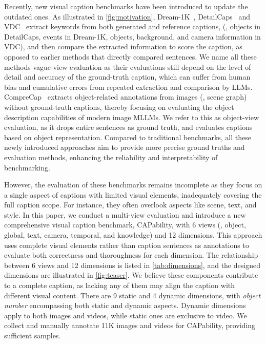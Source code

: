 Recently, new visual caption benchmarks have been introduced to update the outdated ones. As illustrated in \cref{fig:motivation}, Dream-1K~\cite{dream1k}, DetailCaps~\cite{detailcaps} and VDC~\cite{auroracap} extract keywords from both generated and reference captions, (\eg, objects in DetailCaps, events in Dream-1K, objects, background, and camera information in VDC), and then compare the extracted information to score the caption, as opposed to earlier methods that directly compared sentences. We name all these methods vague-view evaluation as their evaluations still depend on the level of detail and accuracy of the ground-truth caption, which can suffer from human bias and cumulative errors from repeated extraction and comparison by LLMs. 
CompreCap~\cite{comprecap} extracts object-related annotations from images (\eg, scene graph) without ground-truth captions, thereby focusing on evaluating the object description capabilities of modern image MLLMs. We refer to this as object-view evaluation, as it drops entire sentences as ground truth, and evaluates captions based on object representation. Compared to traditional benchmarks, all these newly introduced approaches aim to provide more precise ground truths and evaluation methods, enhancing the reliability and interpretability of benchmarking.

However, the evaluation of these benchmarks remains incomplete as they focus on a single aspect of captions with limited visual elements, inadequately covering the full caption scope. For instance, they often overlook aspects like scene, text, and style. 
In this paper, we conduct a multi-view evaluation and introduce a new comprehensive visual caption benchmark, CAPability, with 6 views (\ie, object, global, text, camera, temporal, and knowledge) and 12 dimensions. This approach uses complete visual elements rather than caption sentences as annotations to evaluate both correctness and thoroughness for each dimension. The relationship between 6 views and 12 dimensions is listed in \cref{tab:dimensions}, and the designed dimensions are illustrated in \cref{fig:teaser}. We believe these components contribute to a complete caption, as lacking any of them may align the caption with different visual content. There are 9 static and 4 dynamic dimensions, with \textit{object number} encompassing both static and dynamic aspects. 
Dynamic dimensions apply to both images and videos, while static ones are exclusive to video. We collect and manually annotate 11K images and videos for CAPability, providing sufficient samples.

